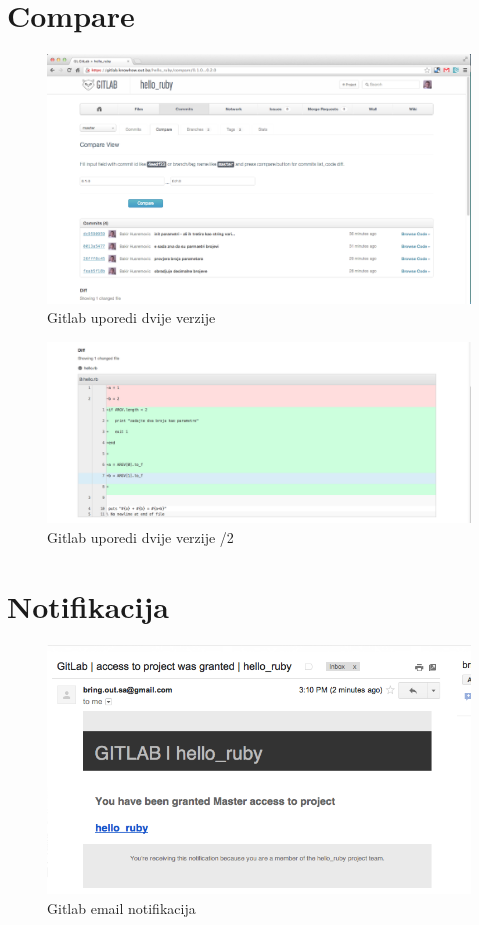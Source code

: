 \documentclass[times, utf8, seminar]{fit}
\begin{document}
\section{Compare}

\begin{figure}[H]
\centering
\includegraphics[width=15cm]{img/gitlab_compare.png}
\caption{Gitlab uporedi dvije verzije}
\end{figure}


\begin{figure}[H]
\centering
\includegraphics[width=15cm]{img/gitlab_compare_2.png}
\caption{Gitlab uporedi dvije verzije /2}
\end{figure}


\section{Notifikacija}

\begin{figure}[H]
\centering
\includegraphics[width=15cm]{img/gitlab_email_notification.png}
\caption{Gitlab email notifikacija}
\end{figure}
\end{document}
